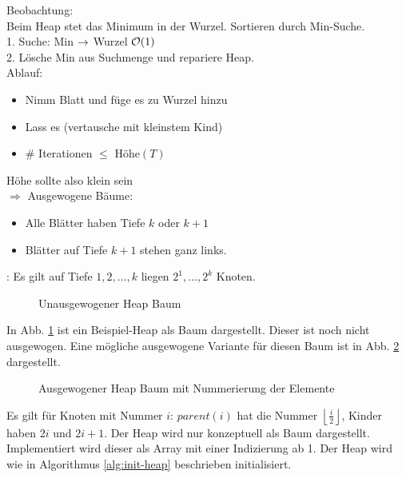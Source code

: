         Beobachtung: \\ 
        Beim Heap stet das Minimum in der Wurzel. Sortieren durch Min-Suche. \\
        1. Suche: Min $\rightarrow$ Wurzel $\mathcal{O}(1)$ \\
        2. Lösche Min aus Suchmenge und repariere Heap. \\

        Ablauf: \\
        \begin{itemize}
            \item Nimm Blatt und füge es zu Wurzel hinzu
            \item Lass es  (vertausche mit kleinstem Kind)
            \item \# Iterationen $\leq$ Höhe$(T)$ 
        \end{itemize}
        Höhe sollte also klein sein\\
        $\Rightarrow$ Ausgewogene Bäume:
        \begin{itemize}
       	\item Alle Blätter haben Tiefe $k$ oder $k+1$ 
        	\item Blätter auf Tiefe $k+1$ stehen ganz links. 
        \end{itemize}
        : Es gilt auf Tiefe $1,2, \ldots, k$ liegen $2^1, \ldots, 2^k$ Knoten.

        \begin{figure}[htp]
            
            \caption{Unausgewogener Heap Baum}
            \label{diag3:unbalanced-heap-tree}
        \end{figure}

        In Abb. \ref{diag3:unbalanced-heap-tree} ist ein Beispiel-Heap als Baum dargestellt.
        Dieser ist noch nicht ausgewogen. Eine mögliche ausgewogene Variante für diesen Baum
        ist in Abb. \ref{diag3.5:balanced-heap-tree} dargestellt.

        
        \begin{figure}[htp]
            
            \caption{Ausgewogener Heap Baum mit Nummerierung der Elemente}
            \label{diag3.5:balanced-heap-tree}
        \end{figure}

        Es gilt für Knoten mit Nummer $i$: $parent(i)$ hat die Nummer
        $\left\lfloor \frac{i}{2} \right\rfloor$, Kinder haben $2i$ und $2i+1$.
        Der Heap wird nur konzeptuell als Baum dargestellt. Implementiert
        wird dieser als Array mit einer Indizierung ab 1. Der Heap wird wie
        in Algorithmus \ref{alg:init-heap} beschrieben initialisiert.

